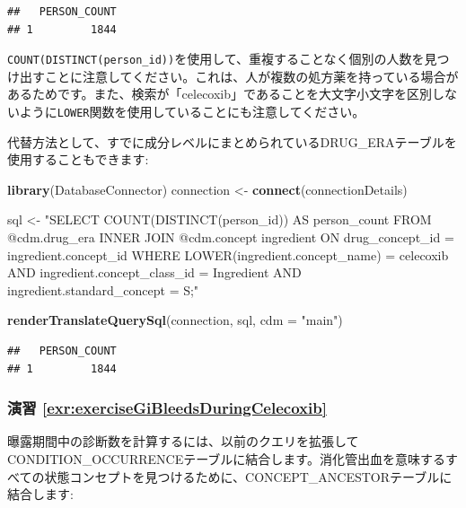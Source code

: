\documentclass[
  11pt]{book}
\newenvironment{Shaded}{\begin{snugshade}}{\end{snugshade}}
\newcommand{\AttributeTok}[1]{\textcolor[rgb]{0.13,0.29,0.53}{#1}}
\newcommand{\FunctionTok}[1]{\textcolor[rgb]{0.13,0.29,0.53}{\textbf{#1}}}
\newcommand{\NormalTok}[1]{#1}
\newcommand{\OtherTok}[1]{\textcolor[rgb]{0.56,0.35,0.01}{#1}}
\newcommand{\StringTok}[1]{\textcolor[rgb]{0.31,0.60,0.02}{#1}}
\theoremstyle{definition}
\theoremstyle{definition}
\theoremstyle{definition}
\theoremstyle{definition}
\theoremstyle{remark}
\begin{document}
\begin{verbatim}
##   PERSON_COUNT
## 1         1844
\end{verbatim}

\texttt{COUNT(DISTINCT(person\_id))}を使用して、重複することなく個別の人数を見つけ出すことに注意してください。これは、人が複数の処方薬を持っている場合があるためです。また、検索が「celecoxib」であることを大文字小文字を区別しないように\texttt{LOWER}関数を使用していることにも注意してください。

代替方法として、すでに成分レベルにまとめられているDRUG\_ERAテーブルを使用することもできます:

\begin{Shaded}
\begin{Highlighting}[]
\FunctionTok{library}\NormalTok{(DatabaseConnector)}
\NormalTok{connection }\OtherTok{\textless{}{-}} \FunctionTok{connect}\NormalTok{(connectionDetails)}

\NormalTok{sql }\OtherTok{\textless{}{-}} \StringTok{"SELECT COUNT(DISTINCT(person\_id)) AS person\_count}
\StringTok{FROM @cdm.drug\_era}
\StringTok{INNER JOIN @cdm.concept ingredient}
\StringTok{  ON drug\_concept\_id = ingredient.concept\_id}
\StringTok{WHERE LOWER(ingredient.concept\_name) = \textquotesingle{}celecoxib\textquotesingle{}}
\StringTok{  AND ingredient.concept\_class\_id = \textquotesingle{}Ingredient\textquotesingle{}}
\StringTok{  AND ingredient.standard\_concept = \textquotesingle{}S\textquotesingle{};"}

\FunctionTok{renderTranslateQuerySql}\NormalTok{(connection, sql, }\AttributeTok{cdm =} \StringTok{"main"}\NormalTok{)}
\end{Highlighting}
\end{Shaded}

\begin{verbatim}
##   PERSON_COUNT
## 1         1844
\end{verbatim}

\subsubsection*{演習 \ref{exr:exerciseGiBleedsDuringCelecoxib}}\label{ux6f14ux7fd2-refexrexercisegibleedsduringcelecoxib}

曝露期間中の診断数を計算するには、以前のクエリを拡張してCONDITION\_OCCURRENCEテーブルに結合します。消化管出血を意味するすべての状態コンセプトを見つけるために、CONCEPT\_ANCESTORテーブルに結合します:
\end{document}
